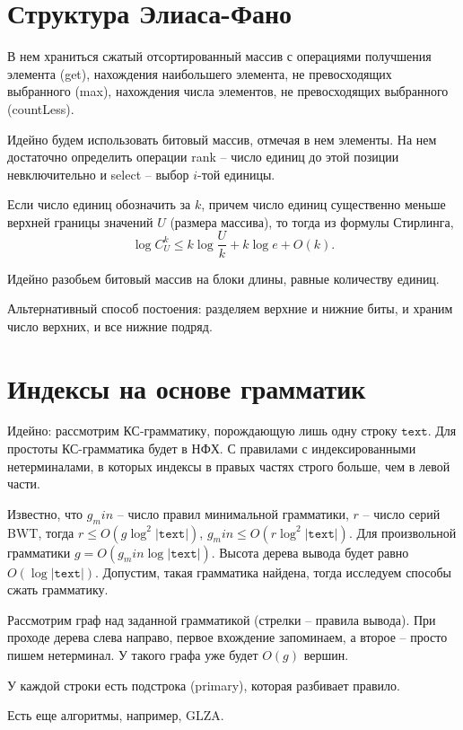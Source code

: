 \documentclass[10pt]{book}
\theoremstyle{plain}
\newcommand{\textm}{\texttt{text}}
\begin{document}
\section{Структура Элиаса-Фано}

В нем храниться сжатый отсортированный массив с операциями получшения элемента
(get), нахождения наибольшего элемента, не превосходящих выбранного (max),
нахождения числа элементов, не превосходящих выбранного (countLess).

Идейно будем использовать битовый массив, отмечая в нем элементы. На нем
достаточно определить операции rank -- число единиц до этой позиции
невключительно и select -- выбор $i$-той единицы.

Если число единиц обозначить за $k$, причем число единиц существенно меньше
верхней границы значений $U$ (размера массива), то тогда из формулы Стирлинга,
$$\log C^k_U \le k \log \frac{U}{k} + k \log e + O(k).$$ 

Идейно разобьем битовый массив на блоки длины, равные количеству единиц.

Альтернативный способ постоения: разделяем верхние и нижние биты, и храним число
верхних, и все нижние подряд.

\section{Индексы на основе грамматик}

Идейно: рассмотрим КС-грамматику, порождающую лишь одну строку $\textm$.
Для простоты КС-грамматика будет в НФХ. С правилами с индексированными
нетерминалами, в которых индексы в правых частях строго больше, чем в
левой части.

Известно, что $g_min$ -- число правил минимальной грамматики, $r$ -- число серий
BWT, тогда $r \le O(g \log^2 |\textm|)$, $g_min \le O(r \log^2 |\textm|)$.
Для произвольной грамматики $g = O(g_min \log |\textm|)$. Высота дерева вывода
будет равно $O(\log |\textm|)$. Допустим, такая грамматика найдена, тогда
исследуем способы сжать грамматику.

Рассмотрим граф над заданной грамматикой (стрелки -- правила вывода).
При проходе дерева слева направо, первое вхождение запоминаем, а второе --
просто пишем нетерминал. У такого графа уже будет $O(g)$ вершин.

У каждой строки есть подстрока (primary), которая разбивает правило.

Есть еще алгоритмы, например, GLZA.
\end{document}
